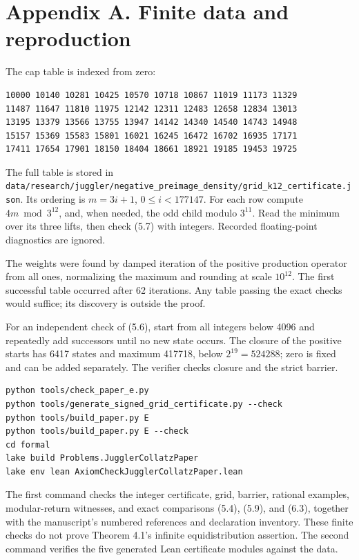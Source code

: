 \documentclass[11pt,a4paper]{article}
\begin{document}
\section{Appendix A. Finite data and
reproduction}\label{appendix-a.-finite-data-and-reproduction}

The cap table is indexed from zero:

\begin{verbatim}
10000 10140 10281 10425 10570 10718 10867 11019 11173 11329
11487 11647 11810 11975 12142 12311 12483 12658 12834 13013
13195 13379 13566 13755 13947 14142 14340 14540 14743 14948
15157 15369 15583 15801 16021 16245 16472 16702 16935 17171
17411 17654 17901 18150 18404 18661 18921 19185 19453 19725
\end{verbatim}

The full table is stored in
\texttt{\nolinkurl{data/research/juggler/negative_preimage_density/grid_k12_certificate.json}}.
Its ordering is \(m=3i+1\), \(0\le i<177147\). For each row compute
\(4m\bmod3^{12}\), and, when needed, the odd child modulo \(3^{11}\).
Read the minimum over its three lifts, then check (5.7) with integers.
Recorded floating-point diagnostics are ignored.

The weights were found by damped iteration of the positive production
operator from all ones, normalizing the maximum and rounding at scale
\(10^{12}\). The first successful table occurred after 62 iterations.
Any table passing the exact checks would suffice; its discovery is
outside the proof.

For an independent check of (5.6), start from all integers below 4096
and repeatedly add successors until no new state occurs. The closure of
the positive starts has 6417 states and maximum 417718, below
\(2^{19}=524288\); zero is fixed and can be added separately. The
verifier checks closure and the strict barrier.

\begin{verbatim}
python tools/check_paper_e.py
python tools/generate_signed_grid_certificate.py --check
python tools/build_paper.py E
python tools/build_paper.py E --check
cd formal
lake build Problems.JugglerCollatzPaper
lake env lean AxiomCheckJugglerCollatzPaper.lean
\end{verbatim}

The first command checks the integer certificate, grid, barrier,
rational examples, modular-return witnesses, and exact comparisons
(5.4), (5.9), and (6.3), together with the manuscript's numbered
references and declaration inventory. These finite checks do not prove
Theorem 4.1's infinite equidistribution assertion. The second command
verifies the five generated Lean certificate modules against the data.
\end{document}
